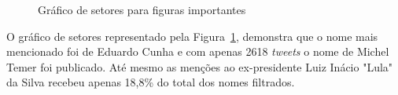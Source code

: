 \begin{figure}[h]
	\centering
	\caption{Gráfico de setores para figuras importantes}
	\vspace{-0.3cm}
	\label{fig-pol}
\end{figure}

O gráfico de setores representado pela Figura~\ref{fig-pol}, demonstra que o nome mais mencionado foi de Eduardo Cunha e com apenas 2618 \textit{tweets} o nome de Michel Temer foi publicado. Até mesmo as menções ao ex-presidente Luiz Inácio "Lula" da Silva recebeu apenas 18,8\% do total dos nomes filtrados.






























